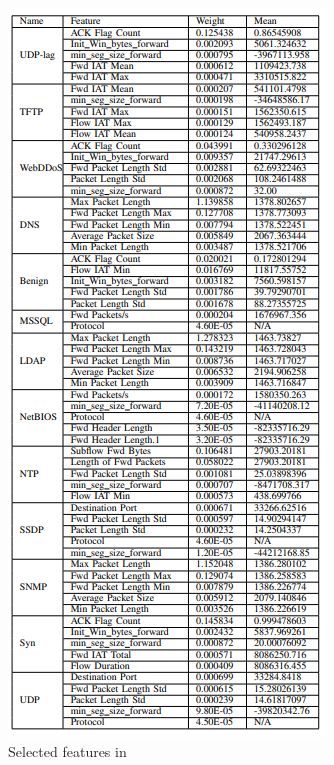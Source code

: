 \begin{enumerate}
\begin{figure}
    \centering
    \includegraphics[scale=1.2]{figures/features.png}
    \captionsetup{font=large}
    \caption{Selected features in \cite{ddos2019}}
    \label{fig:features}
\end{figure}

\end{enumerate}

